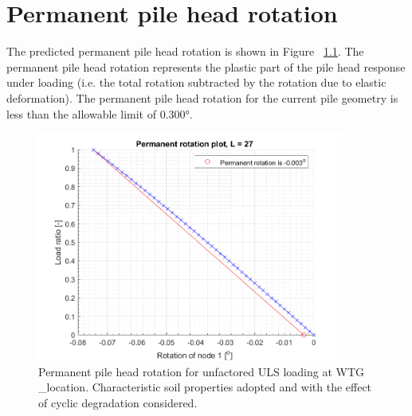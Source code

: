 \chapter{Permanent pile head rotation}\label{sec_6}


The predicted permanent pile head rotation is shown in Figure ~\ref{perm_rotation}. The permanent pile head rotation represents the plastic part of the pile head response under loading (i.e. the total rotation subtracted by the rotation due to elastic deformation). The permanent pile head rotation for the current pile geometry is less than the allowable limit of 0.300°.

\begin{figure}[!htbp]
\includegraphics[width=0.9\textwidth]{AppendixGenerationFiles/ProjectLocation/permanent_rot_def.png}
\caption{Permanent pile head rotation for unfactored ULS loading at WTG {\ID_location}. Characteristic soil properties adopted and with the effect of cyclic degradation considered.}
\label{perm_rotation}\end{figure}
